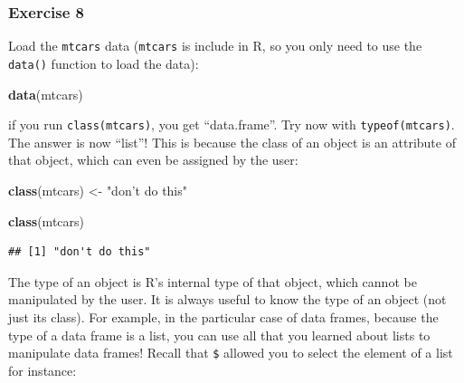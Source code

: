 \documentclass[]{gitbook}
\newenvironment{Shaded}{\begin{snugshade}}{\end{snugshade}}
\newcommand{\DecValTok}[1]{\textcolor[rgb]{0.00,0.00,0.81}{#1}}
\newcommand{\KeywordTok}[1]{\textcolor[rgb]{0.13,0.29,0.53}{\textbf{#1}}}
\newcommand{\NormalTok}[1]{#1}
\newcommand{\OperatorTok}[1]{\textcolor[rgb]{0.81,0.36,0.00}{\textbf{#1}}}
\newcommand{\StringTok}[1]{\textcolor[rgb]{0.31,0.60,0.02}{#1}}
\theoremstyle{definition}
\theoremstyle{definition}
\theoremstyle{definition}
\theoremstyle{remark}
\begin{document}
\hypertarget{exercise-8}{%
\subsubsection*{Exercise 8}\label{exercise-8}}

Load the \texttt{mtcars} data (\texttt{mtcars} is include in R, so you
only need to use the \texttt{data()} function to load the data):

\begin{Shaded}
\begin{Highlighting}[]
\KeywordTok{data}\NormalTok{(mtcars)}
\end{Highlighting}
\end{Shaded}

if you run \texttt{class(mtcars)}, you get ``data.frame''. Try now with
\texttt{typeof(mtcars)}. The answer is now ``list''! This is because the
class of an object is an attribute of that object, which can even be
assigned by the user:

\begin{Shaded}
\begin{Highlighting}[]
\KeywordTok{class}\NormalTok{(mtcars) <-}\StringTok{ "don't do this"}

\KeywordTok{class}\NormalTok{(mtcars)}
\end{Highlighting}
\end{Shaded}

\begin{verbatim}
## [1] "don't do this"
\end{verbatim}

The type of an object is R's internal type of that object, which cannot
be manipulated by the user. It is always useful to know the type of an
object (not just its class). For example, in the particular case of data
frames, because the type of a data frame is a list, you can use all that
you learned about lists to manipulate data frames! Recall that
\texttt{\$} allowed you to select the element of a list for instance:

\begin{Shaded}
\end{Shaded}
\end{document}
